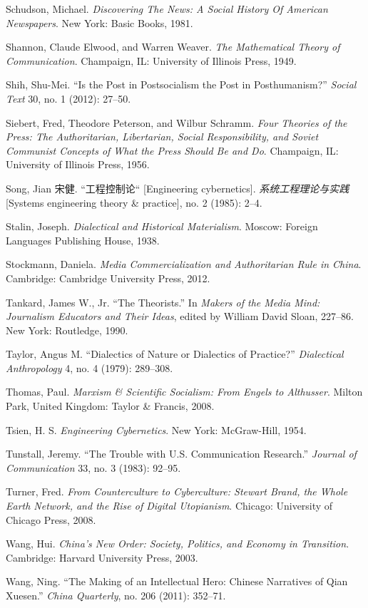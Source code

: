 \documentclass{tufte-handout}
\begin{document}
\begin{hangparas}{.25in}{1}
\begin{CJK*}{UTF8}{gbsn}
Schudson, Michael. \emph{Discovering The News: A Social History Of
American Newspapers}. New York: Basic Books, 1981.

Shannon, Claude Elwood, and Warren Weaver. \emph{The Mathematical Theory
of Communication}. Champaign, IL: University of Illinois Press, 1949.

Shih, Shu-Mei. ``Is the Post in Postsocialism the Post in
Posthumanism?'' \emph{Social Text} 30, no. 1 (2012): 27--50.

Siebert, Fred, Theodore Peterson, and Wilbur Schramm. \emph{Four
Theories of the Press: The Authoritarian, Libertarian, Social
Responsibility, and Soviet Communist Concepts of What the Press Should
Be and Do}. Champaign, IL: University of Illinois Press, 1956.

Song, Jian 宋健. ``工程控制论`` {[}Engineering cybernetics{]}.
\emph{系统工程理论与实践} {[}Systems engineering theory \& practice{]},
no. 2 (1985): 2--4.

Stalin, Joseph. \emph{Dialectical and Historical Materialism}. Moscow:
Foreign Languages Publishing House, 1938.

Stockmann, Daniela. \emph{Media Commercialization and Authoritarian Rule
in China}. Cambridge: Cambridge University Press, 2012.

Tankard, James W., Jr. ``The Theorists.'' In \emph{Makers of the Media
Mind: Journalism Educators and Their Ideas}, edited by William David
Sloan, 227--86. New York: Routledge, 1990.

Taylor, Angus M. ``Dialectics of Nature or Dialectics of Practice?''
\emph{Dialectical Anthropology} 4, no. 4 (1979): 289--308.

Thomas, Paul. \emph{Marxism \& Scientific Socialism: From Engels to
Althusser}. Milton Park, United Kingdom: Taylor \& Francis, 2008.

Tsien, H. S. \emph{Engineering Cybernetics}. New York: McGraw-Hill,
1954.

Tunstall, Jeremy. ``The Trouble with U.S. Communication Research.''
\emph{Journal of Communication} 33, no. 3 (1983): 92--95.

Turner, Fred. \emph{From Counterculture to Cyberculture: Stewart Brand,
the Whole Earth Network, and the Rise of Digital Utopianism}. Chicago:
University of Chicago Press, 2008.

Wang, Hui. \emph{China's New Order: Society, Politics, and Economy in
Transition}. Cambridge: Harvard University Press, 2003.

Wang, Ning. ``The Making of an Intellectual Hero: Chinese Narratives of
Qian Xuesen.'' \emph{China Quarterly}, no. 206 (2011): 352--71.


\end{CJK*}
\end{hangparas}
\end{document}
